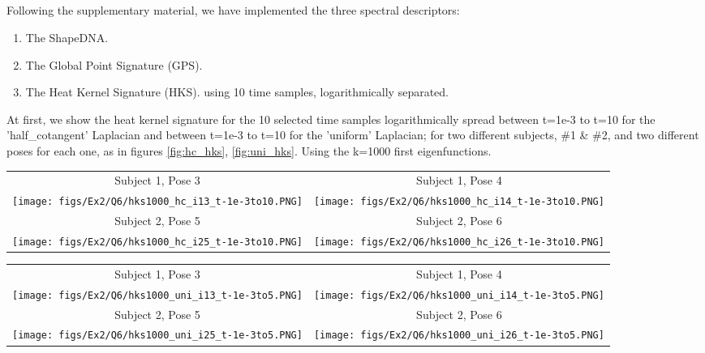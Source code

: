 \subsection{}\label{subsec:classification}
Following the supplementary material, we have implemented the three spectral descriptors:
\begin{enumerate}
    \item The ShapeDNA.
    \item The Global Point Signature (GPS).
    \item The Heat Kernel Signature (HKS). using 10 time samples, logarithmically separated.
\end{enumerate}
 At first, we show the heat kernel signature for the 10 selected time samples logarithmically spread between t=1e-3 to t=10 for the 'half\_cotangent' Laplacian and between t=1e-3 to t=10 for the 'uniform' Laplacian; for two different subjects, \#1 \& \#2, and two different poses for each one, as in figures \ref{fig:hc_hks}, \ref{fig:uni_hks}. Using the k=1000 first eigenfunctions.
 
 \begin{figure*}[p]
\centering
\begin{tabular}{cc}
    \small Subject 1, Pose 3 & \small Subject 1, Pose 4\\
    \texttt{[image: figs/Ex2/Q6/hks1000\_hc\_i13\_t-1e-3to10.PNG]} &
    \texttt{[image: figs/Ex2/Q6/hks1000\_hc\_i14\_t-1e-3to10.PNG]} \\
    \small Subject 2, Pose 5 & \small Subject 2, Pose 6 \\
    \texttt{[image: figs/Ex2/Q6/hks1000\_hc\_i25\_t-1e-3to10.PNG]} &
    \texttt{[image: figs/Ex2/Q6/hks1000\_hc\_i26\_t-1e-3to10.PNG]}
\end{tabular}
 \caption{\small heat kernel signature for the 10 selected time samples logarithmically spread between t=1e-3 to t=10 for the \textbf{'half\_cotangent'} Laplacian, for selected meshes from FAUST.}
 \label{fig:hc_hks}
\end{figure*}

 \begin{figure*}[p]
\centering
\begin{tabular}{cc}
    \small Subject 1, Pose 3 & \small Subject 1, Pose 4\\
    \texttt{[image: figs/Ex2/Q6/hks1000\_uni\_i13\_t-1e-3to5.PNG]} &
    \texttt{[image: figs/Ex2/Q6/hks1000\_uni\_i14\_t-1e-3to5.PNG]} \\
    \small Subject 2, Pose 5 & \small Subject 2, Pose 6 \\
    \texttt{[image: figs/Ex2/Q6/hks1000\_uni\_i25\_t-1e-3to5.PNG]} &
    \texttt{[image: figs/Ex2/Q6/hks1000\_uni\_i26\_t-1e-3to5.PNG]}
\end{tabular}
 \caption{\small heat kernel signature for the 10 selected time samples logarithmically spread between t=1e-3 to t=10 for the \textbf{'uniform'} Laplacian, for selected meshes from FAUST.}
 \label{fig:uni_hks}
\end{figure*}